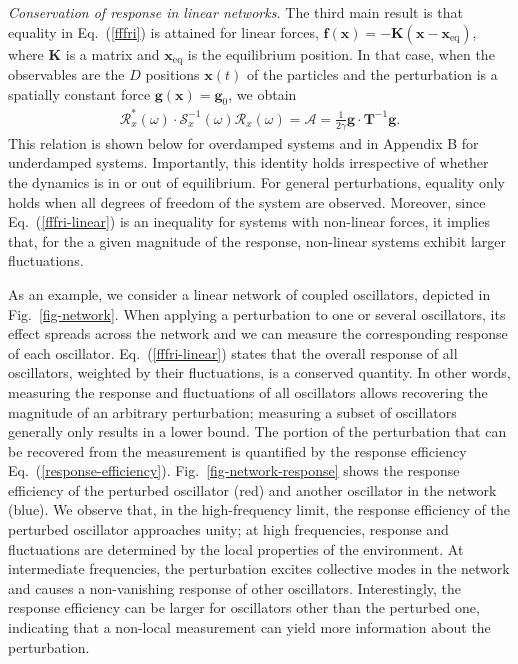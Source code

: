 \documentclass[aps,pre,twocolumn,superscriptaddress,notitlepage]{revtex4-2}
\newcommand{\bmc}[1]{\bm{\mathcal{#1}}}
\renewcommand{\eqref}[1]{Eq.~(\ref{#1})}
\begin{document}
\textit{Conservation of response in linear networks.}
The third main result is that equality in \eqref{fffri} is attained for linear forces, $\bm{f}(\bm{x}) = - \bm{K}(\bm{x} - \bm{x}_\text{eq})$, where $\bm{K}$ is a matrix and $\bm{x}_\text{eq}$ is the equilibrium position.
In that case, when the observables are the $D$ positions $\bm{x}(t)$ of the particles and the perturbation is a spatially constant force $\bm{g}(\bm{x}) = \bm{g}_0$, we obtain
\begin{align}
\bmc{R}_x^*(\omega) \cdot \bmc{S}_x^{-1}(\omega) \bmc{R}_x(\omega) = \mathcal{A} = \frac{1}{2 \gamma} \bm{g} \cdot \bm{T}^{-1} \bm{g} \label{fffri-linear} .
\end{align}
This relation is shown below for overdamped systems and in Appendix B for underdamped systems.
Importantly, this identity holds irrespective of whether the dynamics is in or out of equilibrium.
For general perturbations, equality only holds when all degrees of freedom of the system are observed.
Moreover, since \eqref{fffri-linear} is an inequality for systems with non-linear forces, it implies that, for the a given magnitude of the response, non-linear systems exhibit larger fluctuations.

As an example, we consider a linear network of coupled oscillators, depicted in Fig.~\ref{fig-network}.
When applying a perturbation to one or several oscillators, its effect spreads across the network and we can measure the corresponding response of each oscillator.
\eqref{fffri-linear} states that the overall response of all oscillators, weighted by their fluctuations, is a conserved quantity.
In other words, measuring the response and fluctuations of all oscillators allows recovering the magnitude of an arbitrary perturbation; measuring a subset of oscillators generally only results in a lower bound.
The portion of the perturbation that can be recovered from the measurement is quantified by the response efficiency \eqref{response-efficiency}.
Fig.~\ref{fig-network-response} shows the response efficiency of the perturbed oscillator (red) and another oscillator in the network (blue).
We observe that, in the high-frequency limit, the response efficiency of the perturbed oscillator approaches unity; at high frequencies, response and fluctuations are determined by the local properties of the environment.
At intermediate frequencies, the perturbation excites collective modes in the network and causes a non-vanishing response of other oscillators.
Interestingly, the response efficiency can be larger for oscillators other than the perturbed one, indicating that a non-local measurement can yield more information about the perturbation.
\end{document}
